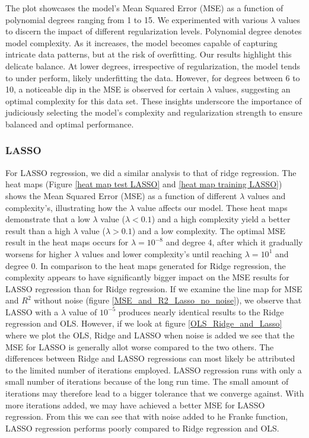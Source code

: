 \noindent The plot showcases the model's Mean Squared Error (MSE) as a function of polynomial degrees ranging from 1 to 15. We experimented with various $\lambda$ values to discern the impact of different regularization levels. Polynomial degree denotes model complexity. As it increases, the model becomes capable of capturing intricate data patterns, but at the risk of overfitting. Our results highlight this delicate balance. At lower degrees, irrespective of regularization, the model tends to under perform, likely underfitting the data. However, for degrees between 6 to 10, a noticeable dip in the MSE is observed for certain $\lambda$ values, suggesting an optimal complexity for this data set. These insights underscore the importance of judiciously selecting the model's complexity and regularization strength to ensure balanced and optimal performance.

\subsubsection{LASSO}
\noindent For LASSO regression, we did a similar analysis to that of ridge regression. The heat maps (Figure \eqref{heat map test LASSO} and \eqref{heat map training LASSO}) shows the Mean Squared Error (MSE) as a function of different $\lambda$ values and complexity's, illustrating how the $\lambda$ value affects our model. These heat maps demonstrate that a low $\lambda$ value ($\lambda < 0.1$) and a high complexity yield a better result than a high $\lambda$ value ($\lambda > 0.1$) and a low complexity. The optimal MSE result in the heat maps occurs for $\lambda = 10^{-8}$ and degree 4, after which it gradually worsens for higher $\lambda$ values and lower complexity's until reaching $\lambda = 10^{1}$ and degree 0. In comparison to the heat maps generated for Ridge regression, the complexity appears to have significantly bigger impact on the MSE results for LASSO regression than for Ridge regression.
\noindent If we examine the line map for MSE and $R^2$ without noise (figure \eqref{MSE_and_R2_Lasso_no_noise}), we observe that LASSO with a $\lambda$ value of $10^{-5}$ produces nearly identical results to the Ridge regression and OLS. However, if we look at figure \eqref{OLS_Ridge_and_Lasso} where we plot the OLS, Ridge and LASSO when noise is added we see that the MSE for LASSO is generally allot worse compared to the two others. 
\noindent The differences between Ridge and LASSO regressions can most likely be attributed to the limited number of iterations employed. LASSO regression runs with only a small number of iterations because of the long run time. The small amount of iterations may therefore lead to a bigger tolerance that we converge against. With more iterations added, we may have achieved a better MSE for LASSO regression. From this we can see that with noise added to he Franke function, LASSO regression performs poorly compared to Ridge regression and OLS. 

